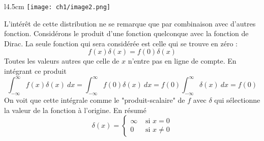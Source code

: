 \begin{wrapfigure}[7]{l}{4.5cm}
\vspace{-17mm}
\texttt{[image: ch1/image2.png]}
\end{wrapfigure}
L'intérêt de cette distribution ne se remarque que par combinaison avec d'autres 
fonction. Considérons le produit d'une fonction quelconque avec la fonction de 
Dirac. La seule fonction qui sera considérée est celle qui se trouve en zéro :
\begin{equation}
f(x)\delta(x) = f(0)\delta(x)
\end{equation}
Toutes les valeurs autres que celle de $x$ n'entre pas en ligne de compte. En 
intégrant ce produit 
\begin{equation}
\int_{-\infty}^{\infty} f(x)\delta(x)\ dx = \int_{-\infty}^\infty f(0)\delta(x)\ dx
= f(0)\int_{-\infty}^{\infty}\delta(x)\ dx = f(0)
\end{equation}
On voit que cette intégrale comme le "produit-scalaire" de $f$ avec $\delta$ qui 
sélectionne la valeur de la fonction à l'origine. En résumé
\begin{equation}
\delta(x) = \left\{\begin{array}{ll}
\infty & \text{ si } x = 0\\
0 & \text{ si } x \neq 0
\end{array} \right.
\end{equation}

